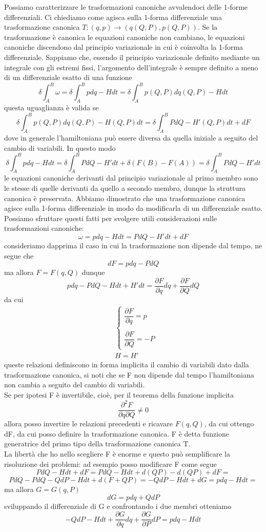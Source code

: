 \documentclass[
10pt, %
a4paper, %
oneside, %
headinclude,footinclude, %
BCOR5mm, %
]{scrartcl}
\begin{document}
Possiamo caratterizzare le trasformazioni canoniche avvalendoci delle 1-forme differenziali. Ci chiediamo come agisca sulla 1-forma differenziale una trasformazione canonica \(T:(q, p)\rightarrow(q(Q, P), p(Q, P))\). Se la trasformazione è canonica le equazioni canoniche non cambiano, le equazioni canoniche discendono dal principio variazionale in cui è coinvolta la 1-forma differenziale. Sappiamo che, essendo il principio variazionale definito mediante un integrale con gli estremi fissi, l'argomento dell'integrale è sempre definito a meno di un differenziale esatto di una funzione
\[\delta\int_{A}^{B}\omega= \delta\int_{A}^{B}p{dq}-Hdt= \delta\int_{A}^{B} p(Q, P){dq(Q, P)}-Hdt\]
questa uguaglianza è valida se
\[\delta\int_{A}^{B} p(Q, P){dq(Q, P)}-H(Q, P)dt = \delta\int_{A}^{B} PdQ-H'(Q, P)dt+dF\]
dove in generale l'hamiltoniana può essere diversa da quella iniziale a seguito del cambio di variabili. In questo modo
\[\delta\int_{A}^{B}p{dq}-Hdt = \delta\int_{A}^{B} PdQ-H'dt+\delta (F(B)-F(A))= \delta\int_{A}^{B} PdQ-H'dt\]
le equazioni canoniche derivanti dal principio variazionale al primo membro sono le stesse di quelle derivanti da quello a secondo membro, dunque la struttura canonica è preservata. Abbiamo dimostrato che una trasformazione canonica agisce sulla 1-forma differenziale in modo da modificarla di un differenziale esatto.\\ 
Possiamo sfruttare questi fatti per svolgere utili considerazioni sulle trasformazioni canoniche: 
\[\omega = pdq-Hdt = PdQ-H'dt +dF\]
consideriamo dapprima il caso in cui la trasformazione non dipende dal tempo, ne segue che
\[dF =  pdq-PdQ\]
ma allora \(F=F(q, Q)\) dunque
\[ pdq-PdQ-Hdt+H'dt = \frac{\partial F}{\partial q}dq+\frac{\partial F}{\partial Q}dQ\]
da cui
\begin{align*}
	&\begin{cases}
		\dfrac{\partial F}{\partial q} = p\\\\
		\dfrac{\partial F}{\partial Q} = -P
	\end{cases}\\
&H = H'
\end{align*}
queste relazioni definiscono in forma implicita il cambio di variabili dato dalla trasformazione canonica, si noti che se F non dipende dal tempo l'hamiltoniana non cambia a seguito del cambio di variabili.\\
 Se per ipotesi F è invertibile, cioè, per il teorema della funzione implicita
\[\frac{\partial^2 F}{\partial q\partial Q}\neq 0\]
allora posso invertire le relazioni precedenti e ricavare \(F(q, Q)\), da cui ottengo dF, da cui posso definire la trasformazione canonica. F è detta funzione generatrice del primo tipo della trasformazione canonica T.\\
La libertà che ho nello scegliere F è enorme e questo può semplificare la risoluzione dei problemi: ad esempio posso modificare F come segue
\[PdQ-Hdt +dF= PdQ-Hdt +d(QP)-d(QP)+dF=\]
\[PdQ-PdQ-QdP-Hdt+d(F+QP) = -QdP-Hdt+dG = pdq-Hdt=\]
ma allora \(G = G(q, P)\)
\[dG = pdq+QdP\]
sviluppando il differenziale di G e confrontando i due membri otteniamo
\[-QdP-Hdt+\frac{\partial G}{\partial q}dq+\frac{\partial G}{\partial P}dP = pdq-Hdt\]
\end{document}
